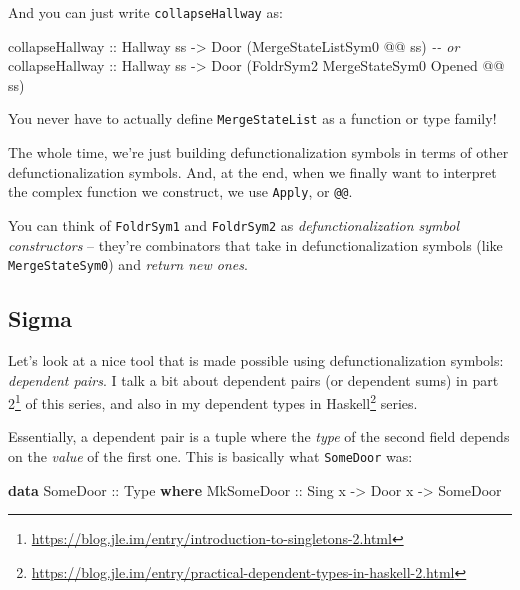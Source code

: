 \documentclass[]{article}
\newenvironment{Shaded}{}{}
\newcommand{\CommentTok}[1]{\textcolor[rgb]{0.38,0.63,0.69}{\textit{#1}}}
\newcommand{\DataTypeTok}[1]{\textcolor[rgb]{0.56,0.13,0.00}{#1}}
\newcommand{\KeywordTok}[1]{\textcolor[rgb]{0.00,0.44,0.13}{\textbf{#1}}}
\newcommand{\NormalTok}[1]{#1}
\newcommand{\OperatorTok}[1]{\textcolor[rgb]{0.40,0.40,0.40}{#1}}
\newcommand{\OtherTok}[1]{\textcolor[rgb]{0.00,0.44,0.13}{#1}}
\renewcommand{\href}[2]{#2\footnote{\url{#1}}}
\begin{document}
And you can just write \texttt{collapseHallway} as:

\begin{Shaded}
\begin{Highlighting}[]
\OtherTok{collapseHallway ::} \DataTypeTok{Hallway}\NormalTok{ ss }\OtherTok{{-}>} \DataTypeTok{Door}\NormalTok{ (}\DataTypeTok{MergeStateListSym0} \OperatorTok{@@}\NormalTok{ ss)}
\CommentTok{{-}{-} or}
\OtherTok{collapseHallway ::} \DataTypeTok{Hallway}\NormalTok{ ss }\OtherTok{{-}>} \DataTypeTok{Door}\NormalTok{ (}\DataTypeTok{FoldrSym2} \DataTypeTok{MergeStateSym0} \DataTypeTok{\textquotesingle{}Opened} \OperatorTok{@@}\NormalTok{ ss)}
\end{Highlighting}
\end{Shaded}

You never have to actually define \texttt{MergeStateList} as a function or type
family!

The whole time, we're just building defunctionalization symbols in terms of
other defunctionalization symbols. And, at the end, when we finally want to
interpret the complex function we construct, we use \texttt{Apply}, or
\texttt{@@}.

You can think of \texttt{FoldrSym1} and \texttt{FoldrSym2} as
\emph{defunctionalization symbol constructors} -- they're combinators that take
in defunctionalization symbols (like \texttt{MergeStateSym0}) and \emph{return
new ones}.

\hypertarget{sigma}{%
\subsection{Sigma}\label{sigma}}

Let's look at a nice tool that is made possible using defunctionalization
symbols: \emph{dependent pairs}. I talk a bit about dependent pairs (or
dependent sums) in
\href{https://blog.jle.im/entry/introduction-to-singletons-2.html}{part 2} of
this series, and also in my
\href{https://blog.jle.im/entry/practical-dependent-types-in-haskell-2.html}{dependent
types in Haskell} series.

Essentially, a dependent pair is a tuple where the \emph{type} of the second
field depends on the \emph{value} of the first one. This is basically what
\texttt{SomeDoor} was:

\begin{Shaded}
\begin{Highlighting}[]
\KeywordTok{data} \DataTypeTok{SomeDoor}\OtherTok{ ::} \DataTypeTok{Type} \KeywordTok{where}
    \DataTypeTok{MkSomeDoor}\OtherTok{ ::} \DataTypeTok{Sing}\NormalTok{ x }\OtherTok{{-}>} \DataTypeTok{Door}\NormalTok{ x }\OtherTok{{-}>} \DataTypeTok{SomeDoor}
\end{Highlighting}
\end{Shaded}
\end{document}
